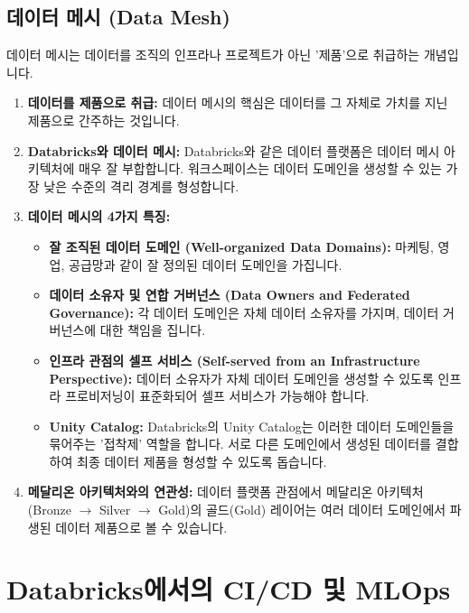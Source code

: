 \documentclass[11pt,a4paper]{article}
\begin{document}
\subsection{데이터 메시 (Data Mesh)}
데이터 메시는 데이터를 조직의 인프라나 프로젝트가 아닌 '제품'으로 취급하는 개념입니다.

\begin{enumerate}
    \item \textbf{데이터를 제품으로 취급:}
    데이터 메시의 핵심은 데이터를 그 자체로 가치를 지닌 제품으로 간주하는 것입니다.

    \item \textbf{Databricks와 데이터 메시:}
    Databricks와 같은 데이터 플랫폼은 데이터 메시 아키텍처에 매우 잘 부합합니다. 워크스페이스는 데이터 도메인을 생성할 수 있는 가장 낮은 수준의 격리 경계를 형성합니다.

    \item \textbf{데이터 메시의 4가지 특징:}
    \begin{itemize}
        \item \textbf{잘 조직된 데이터 도메인 (Well-organized Data Domains):} 마케팅, 영업, 공급망과 같이 잘 정의된 데이터 도메인을 가집니다.
        \item \textbf{데이터 소유자 및 연합 거버넌스 (Data Owners and Federated Governance):} 각 데이터 도메인은 자체 데이터 소유자를 가지며, 데이터 거버넌스에 대한 책임을 집니다.
        \item \textbf{인프라 관점의 셀프 서비스 (Self-served from an Infrastructure Perspective):} 데이터 소유자가 자체 데이터 도메인을 생성할 수 있도록 인프라 프로비저닝이 표준화되어 셀프 서비스가 가능해야 합니다.
        \item \textbf{Unity Catalog:} Databricks의 Unity Catalog는 이러한 데이터 도메인들을 묶어주는 '접착제' 역할을 합니다. 서로 다른 도메인에서 생성된 데이터를 결합하여 최종 데이터 제품을 형성할 수 있도록 돕습니다.
    \end{itemize}

    \item \textbf{메달리온 아키텍처와의 연관성:}
    데이터 플랫폼 관점에서 메달리온 아키텍처(Bronze $\rightarrow$ Silver $\rightarrow$ Gold)의 골드(Gold) 레이어는 여러 데이터 도메인에서 파생된 데이터 제품으로 볼 수 있습니다.
\end{enumerate}

\newpage
\section{Databricks에서의 CI/CD 및 MLOps}
\end{document}
